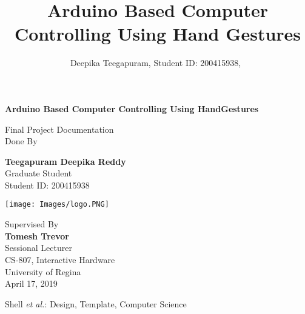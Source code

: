 \documentclass[12pt,journal]{IEEEtran}
\begin{document}
\begin{titlepage}
    \begin{center}
        \vspace*{1cm}
 
        \Huge
        \textbf{Arduino Based Computer Controlling Using HandGestures}
 
        \vspace{0.1cm}
        \LARGE
        Final Project Documentation\\
        Done By\\
        \vspace{1.5cm}
 
        \textbf{ Teegapuram Deepika Reddy}
         \LARGE
         \\ 
         Graduate Student\\
         Student ID: 200415938
        \vspace{1.5cm}
 
        \texttt{[image: Images/logo.PNG]}
 
        \Large
        Supervised By \\
        \textbf{Tomesh Trevor }\\
        Sessional Lecturer \\
        CS-807, Interactive Hardware\\
        University of Regina \\
        April 17, 2019
 
    \end{center}
\end{titlepage}

\tableofcontents



\title{Arduino Based Computer Controlling Using Hand Gestures}


\author{Deepika Teegapuram, Student ID: 200415938,~
        }
\onecolumn



%
{Shell \MakeLowercase{\textit{et al.}}: Design, Template, Computer Science }
\end{document}
